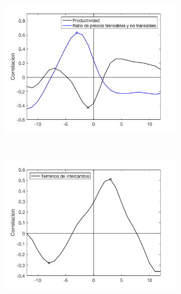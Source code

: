 \documentclass[12pt,letterpaper]{article}
\begin{document}
\begin{figure}
    \begin{subfigure}[b]{0.48\textwidth}
        \includegraphics[width=\textwidth]{fig16}
    \end{subfigure}
    ~ %
   \begin{subfigure}[b]{0.48\textwidth}
       \includegraphics[width=\textwidth]{fig17}
    \end{subfigure}
  

\end{figure}
\end{document}
